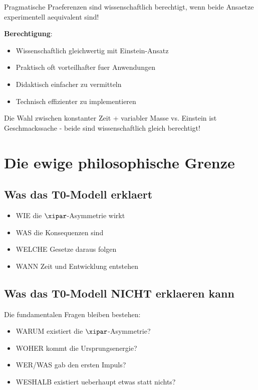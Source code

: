 	\begin{tcolorbox}[colback=green!5!white,colframe=green!75!black,title=Wichtige Erkenntnis]
		Pragmatische Praeferenzen sind wissenschaftlich berechtigt, wenn beide Ansaetze experimentell aequivalent sind!
	\end{tcolorbox}
	
	\textbf{Berechtigung}:
	\begin{itemize}
		\item Wissenschaftlich gleichwertig mit Einstein-Ansatz
		\item Praktisch oft vorteilhafter fuer Anwendungen
		\item Didaktisch einfacher zu vermitteln
		\item Technisch effizienter zu implementieren
	\end{itemize}
	
	Die Wahl zwischen konstanter Zeit + variabler Masse vs. Einstein ist Geschmackssache - beide sind wissenschaftlich gleich berechtigt!
	
	\section{Die ewige philosophische Grenze}
	
	\subsection{Was das T0-Modell erklaert}
	
	\begin{itemize}
		\item WIE die $\xipar$-Asymmetrie wirkt
		\item WAS die Konsequenzen sind
		\item WELCHE Gesetze daraus folgen
		\item WANN Zeit und Entwicklung entstehen
	\end{itemize}
	
	\subsection{Was das T0-Modell NICHT erklaeren kann}
	
	Die fundamentalen Fragen bleiben bestehen:
	\begin{itemize}
		\item WARUM existiert die $\xipar$-Asymmetrie?
		\item WOHER kommt die Ursprungsenergie?
		\item WER/WAS gab den ersten Impuls?
		\item WESHALB existiert ueberhaupt etwas statt nichts?
	\end{itemize}
	
